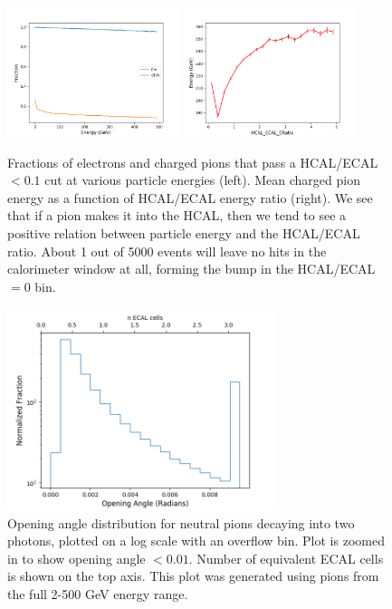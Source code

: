 \begin{figure}[htbp]
    \centering
    \includegraphics[width=0.45\textwidth]{Images/Calo/ratio_cut_vs_energy.png}
    \includegraphics[width=0.45\textwidth]{Images/Calo/mean_energy_vs_ratio.png}
    \caption{Fractions of electrons and charged pions that pass a HCAL/ECAL $< 0.1$ cut at various particle energies (left). Mean charged pion energy as a function of HCAL/ECAL energy ratio (right). We see that if a pion makes it into the HCAL, then we tend to see a positive relation between particle energy and the HCAL/ECAL ratio. About 1 out of 5000 events will leave no hits in the calorimeter window at all, forming the bump in the HCAL/ECAL $= 0$ bin.}
    \label{fig:HE_ratio_energy}
\end{figure}

\begin{figure}[htbp]
    \centering
    \includegraphics[width=0.7\textwidth]{Images/Calo/zoom_opening_angles.png}
    \caption{Opening angle distribution for neutral pions decaying into two photons, plotted on a log scale with an overflow bin. Plot is zoomed in to show opening angle $< 0.01$. Number of equivalent ECAL cells is shown on the top axis. This plot was generated using pions from the full 2-500 GeV energy range.}
    \label{fig:opening_angle}
\end{figure}

